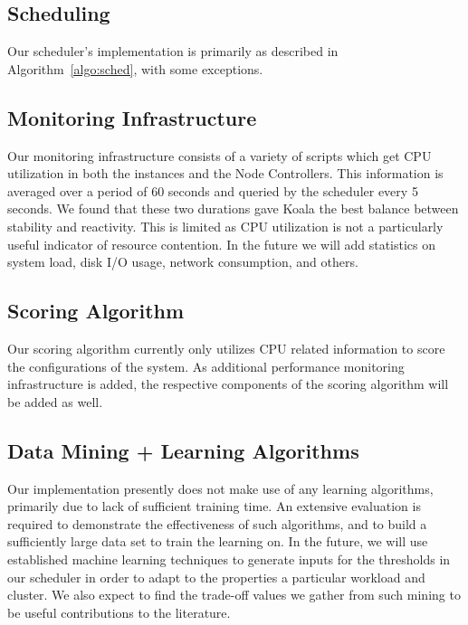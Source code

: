 \subsection{Scheduling}


Our scheduler's implementation is primarily as described in
Algorithm~\ref{algo:sched}, with some exceptions.

\subsection{Monitoring Infrastructure}

Our monitoring infrastructure consists of a variety of scripts which get CPU utilization in both the instances and the Node Controllers.   This information is averaged over a period of 60 seconds and queried by the scheduler every 5 seconds.  We found that these two durations gave Koala the best balance between stability and reactivity.  This is limited as CPU utilization is not a particularly useful indicator of resource contention.  In the future we will add statistics on system load, disk I/O usage, network consumption, and others.

\subsection{Scoring Algorithm}

Our scoring algorithm currently only utilizes CPU related information to score the configurations of the system.  As additional performance monitoring infrastructure is added, the respective components of the scoring algorithm will be added as well.

\subsection{Data Mining + Learning Algorithms}

Our implementation presently does not make use of any learning algorithms,
primarily due to lack of sufficient training time.  An extensive evaluation is required
to demonstrate the effectiveness of such algorithms, and to build a sufficiently
large data set to train the learning on.  In the future, we will use established
machine learning techniques to generate inputs for the thresholds in our
scheduler in order to adapt to the properties a particular workload and cluster.
We also expect to find the trade-off values we gather from such mining to be
useful contributions to the literature.


